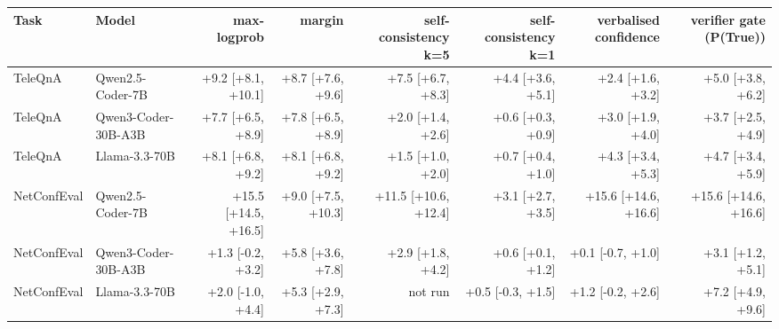 \begin{tabular}{llrrrrrr}
\toprule
Task & Model & max-logprob & margin & self-consistency k=5 & self-consistency k=1 & verbalised confidence & verifier gate (P(True)) \\
\midrule
TeleQnA & Qwen2.5-Coder-7B & +9.2 [+8.1, +10.1] & +8.7 [+7.6, +9.6] & +7.5 [+6.7, +8.3] & +4.4 [+3.6, +5.1] & +2.4 [+1.6, +3.2] & +5.0 [+3.8, +6.2] \\
TeleQnA & Qwen3-Coder-30B-A3B & +7.7 [+6.5, +8.9] & +7.8 [+6.5, +8.9] & +2.0 [+1.4, +2.6] & +0.6 [+0.3, +0.9] & +3.0 [+1.9, +4.0] & +3.7 [+2.5, +4.9] \\
TeleQnA & Llama-3.3-70B & +8.1 [+6.8, +9.2] & +8.1 [+6.8, +9.2] & +1.5 [+1.0, +2.0] & +0.7 [+0.4, +1.0] & +4.3 [+3.4, +5.3] & +4.7 [+3.4, +5.9] \\
NetConfEval & Qwen2.5-Coder-7B & +15.5 [+14.5, +16.5] & +9.0 [+7.5, +10.3] & +11.5 [+10.6, +12.4] & +3.1 [+2.7, +3.5] & +15.6 [+14.6, +16.6] & +15.6 [+14.6, +16.6] \\
NetConfEval & Qwen3-Coder-30B-A3B & +1.3 [-0.2, +3.2] & +5.8 [+3.6, +7.8] & +2.9 [+1.8, +4.2] & +0.6 [+0.1, +1.2] & +0.1 [-0.7, +1.0] & +3.1 [+1.2, +5.1] \\
NetConfEval & Llama-3.3-70B & +2.0 [-1.0, +4.4] & +5.3 [+2.9, +7.3] & not run & +0.5 [-0.3, +1.5] & +1.2 [-0.2, +2.6] & +7.2 [+4.9, +9.6] \\
\bottomrule
\end{tabular}
